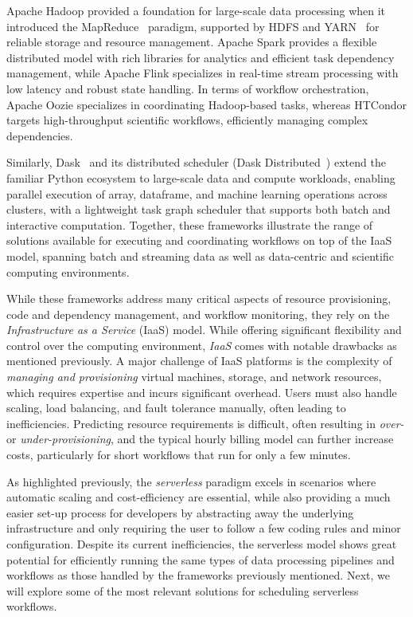 Apache Hadoop provided a foundation for large-scale data processing when it introduced the MapReduce~\cite{mapreduce} paradigm, supported by HDFS and YARN~\cite{yarn} for reliable storage and resource management. Apache Spark provides a flexible distributed model with rich libraries for analytics and efficient task dependency management, while Apache Flink specializes in real-time stream processing with low latency and robust state handling. In terms of workflow orchestration, Apache Oozie specializes in coordinating Hadoop-based tasks, whereas HTCondor targets high-throughput scientific workflows, efficiently managing complex dependencies. 

Similarly, Dask~\cite{dask_python} and its distributed scheduler (Dask Distributed~\cite{dask_python_distributed}) extend the familiar Python ecosystem to large-scale data and compute workloads, enabling parallel execution of array, dataframe, and machine learning operations across clusters, with a lightweight task graph scheduler that supports both batch and interactive computation. Together, these frameworks illustrate the range of solutions available for executing and coordinating workflows on top of the IaaS model, spanning batch and streaming data as well as data-centric and scientific computing environments.

While these frameworks address many critical aspects of resource provisioning, code and dependency management, and workflow monitoring, they rely on the \textit{Infrastructure as a Service} (IaaS) model. While offering significant flexibility and control over the computing environment, \textit{IaaS} comes with notable drawbacks as mentioned previously. A major challenge of IaaS platforms is the complexity of \textit{managing and provisioning} virtual machines, storage, and network resources, which requires expertise and incurs significant overhead. Users must also handle scaling, load balancing, and fault tolerance manually, often leading to inefficiencies. Predicting resource requirements is difficult, often resulting in \textit{over-} or \textit{under-provisioning}, and the typical hourly billing model can further increase costs, particularly for short workflows that run for only a few minutes.

As highlighted previously, the \textit{serverless} paradigm excels in scenarios where automatic scaling and cost-efficiency are essential, while also providing a much easier set-up process for developers by abstracting away the underlying infrastructure and only requiring the user to follow a few coding rules and minor configuration. Despite its current inefficiencies, the serverless model shows great potential for efficiently running the same types of data processing pipelines and workflows as those handled by the frameworks previously mentioned. Next, we will explore some of the most relevant solutions for scheduling serverless workflows.


